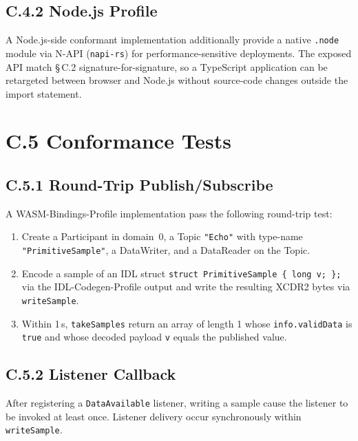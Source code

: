 \documentclass{../styles/zerodds-vendor-spec}
\begin{document}
\subsection*{C.4.2 Node.js Profile}

A Node.js-side conformant implementation  additionally
provide a native \texttt{.node} module via N-API
(\texttt{napi-rs}) for performance-sensitive deployments. The
exposed API  match \S\,C.2 signature-for-signature,
so a TypeScript application can be retargeted between browser
and Node.js without source-code changes outside the import
statement.

\section*{C.5 Conformance Tests}

\subsection*{C.5.1 Round-Trip Publish/Subscribe}

A WASM-Bindings-Profile implementation  pass the
following round-trip test:

\begin{enumerate}
  \item Create a Participant in domain~0, a Topic \texttt{"Echo"}
        with type-name \texttt{"PrimitiveSample"}, a DataWriter,
        and a DataReader on the Topic.
  \item Encode a sample of an IDL struct
        \texttt{struct PrimitiveSample \{ long v;\,\};} via the
        IDL-Codegen-Profile output and write the resulting
        XCDR2 bytes via \texttt{writeSample}.
  \item Within 1\,s, \texttt{takeSamples}  return an
        array of length 1 whose \texttt{info.validData} is
        \texttt{true} and whose decoded payload \texttt{v} equals
        the published value.
\end{enumerate}

\subsection*{C.5.2 Listener Callback}

After registering a \texttt{DataAvailable} listener, writing a
sample  cause the listener to be invoked at least
once. Listener delivery  occur synchronously
within \texttt{writeSample}.
\end{document}
